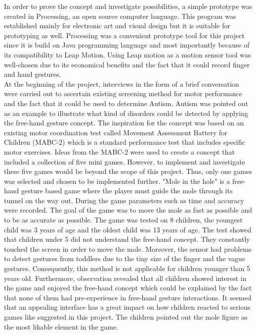 In order to prove the concept and investigate possibilities, a simple prototype was created in Processing, an open source computer language. This program was established mainly for electronic art and visual design but it is suitable for prototyping as well. Processing was a convenient prototype tool for this project since it is build on Java programming language and most importantly because of its compatibility to Leap Motion. Using Leap motion as a motion sensor tool was well-chosen due to its economical benefits and the fact that it could record finger and hand gestures.\\
At the beginning of the project, interviews in the form of a brief conversation were carried out to ascertain existing screening method for motor performance and the fact that it could be used to determine Autism. Autism was pointed out as an example to illustrate what kind of disorders could be detected by applying the free-hand gesture concept. The inspiration for the concept was based on an existing motor coordination test called Movement Assessment Battery for Children (MABC-2) which is a standard performance test that includes specific motor exercises.  
Ideas from the MABC-2 were used to create a concept that included a collection of five mini games. However, to implement and investigate these five games would be beyond the scope of this project. Thus, only one games was selected and chosen to be implemented further. "Mole in the hole" is a free-hand gesture based game where the player must guide the mole through its tunnel on the way out. During the game parameters such as time and accuracy were recorded. The goal of the game was to move the mole as fast as possible and to be as accurate as possible.
The game was tested on 8 children, the youngest child was 3 years of age and the oldest child was 13 years of age. The test showed that children under 5 did not understand the free-hand concept. They constantly touched the screen in order to move the mole. Moreover, the sensor had problems to detect gestures from toddlers due to the tiny size of the finger and the vague gestures. Consequently, this method is not applicable for children younger than 5 years old. 
Furthermore, observation revealed that all children showed interest in the game and enjoyed the free-hand concept which could be explained by the fact that none of them had pre-experience in free-hand gesture interactions. It seemed that an appealing interface has a great impact on how children reacted to serious games like suggested in this project. The children pointed out the mole figure as the most likable element in the game. 

